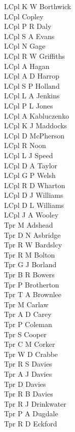 \begin{multicols}{4}
  LCpl K W Borthwick \\
  LCpl Copley \\
  LCpl P R Daly \\
  LCpl S A Evans \\
  LCpl N Gage \\
  LCpl R W Griffiths \\
  LCpl A Hagan \\
  LCpl A D Harrop \\
  LCpl S P Holland \\
  LCpl L A Jenkins \\
  LCpl P L Jones \\
  LCpl A Kabluczenko \\
  LCpl K J Maddocks \\
  LCpl D McPherson \\
  LCpl R Noon \\
  LCpl L J Speed \\
  LCpl D A Taylor \\
  LCpl G P Welsh \\
  LCpl R D Wharton \\
  LCpl D J Williams \\
  LCpl D L Williams \\
  LCpl J A Wooley \\
  Tpr M Adshead \\
  Tpr D N Asbridge \\
  Tpr R W Bardslcy \\
  Tpr R M Bolton \\
  Tpr G J Borland \\
  Tpr B R Bowers \\
  Tpr P Brotherton \\
  Tpr T A Brownlee \\
  Tpr M Carlaw \\
  Tpr A D Carey \\
  Tpr P Coleman \\
  Tpr S Cooper \\
  Tpr C M Corker \\
  Tpr W D Crabbe \\
  Tpr R S Davies \\
  Tpr A J Davies \\
  Tpr D Davies \\
  Tpr R B Davies \\
  Tpr R J Drinkwater \\
  Tpr P A Dugdale \\
  Tpr R D Eckford \\

\end{multicols}
